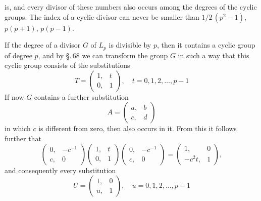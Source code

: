 is, and every divisor of these numbers also occurs among the degrees of the cyclic groups. The index of a cyclic divisor can never be smaller than $1/2\,(p^2-1)$, $p(p+1)$, $p(p-1)$.

If the degree of a divisor $G$ of $L_p$ is divisible by $p$, then it contains a cyclic group of degree $p$, and by \S.\,68 we can transform the group $G$ in such a way that this cyclic group consists of the substitutions
\[
T = \begin{pmatrix}1, & t\\ 0, & 1\end{pmatrix}, \quad t = 0, 1, 2, \ldots, p-1
\]
If now $G$ contains a further substitution
\[
A = \begin{pmatrix}a, & b\\ c, & d\end{pmatrix}
\]
in which $c$ is different from zero, then
also occurs in it. From this it follows further that
\[
\begin{pmatrix}0, & -c^{-1}\\ c, & 0\end{pmatrix}\begin{pmatrix}1, & t\\ 0, & 1\end{pmatrix}\begin{pmatrix}0, & -c^{-1}\\ c, & 0\end{pmatrix} = \begin{pmatrix}1, & 0\\ -c^2 t, & 1\end{pmatrix},
\]
and consequently every substitution
\[
U = \begin{pmatrix}1, & 0\\ u, & 1\end{pmatrix}, \quad u = 0, 1, 2, \ldots, p-1
\]
